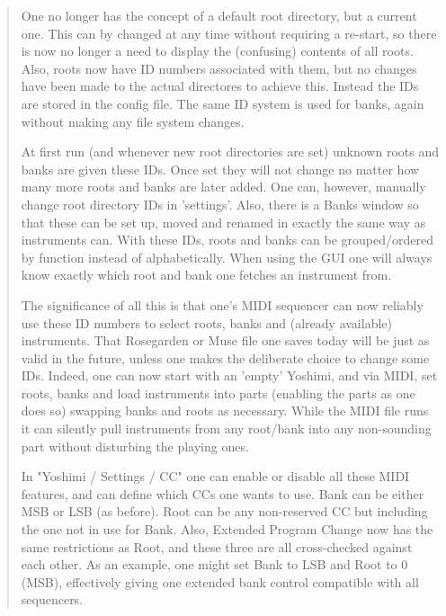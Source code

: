    \begin{quotation}
      One no longer has the concept of a default root directory, but a
      current one. This can by changed at any time without requiring a
      re-start, so there is now no longer a need to display the (confusing)
      contents of all roots.  Also, roots now have ID numbers associated
      with them, but no changes have been made to the actual directores to
      achieve this. Instead the IDs are stored in the config file. The same
      ID system is used for banks, again without making any file system
      changes.

      At first run (and whenever new root directories are set) unknown roots
      and banks are given these IDs. Once set they will not change no matter
      how many more roots and banks are later added. One can, however,
      manually change root directory IDs in 'settings'. Also, there is a
      Banks window so that these can be set up, moved and renamed in exactly
      the same way as instruments can.  With these IDs, roots and banks can
      be grouped/ordered by function instead of alphabetically. When using
      the GUI one will always know exactly which root and bank one fetches
      an instrument from.

      The significance of all this is that one's MIDI sequencer can now
      reliably use these ID numbers to select roots, banks and (already
      available) instruments. That Rosegarden or Muse file one saves
      today will be just as valid in the future, unless one makes the
      deliberate choice to change some IDs. Indeed, one can now start with
      an 'empty' Yoshimi, and via MIDI, set roots, banks and load
      instruments into parts (enabling the parts as one does so) swapping
      banks and roots as necessary. While the MIDI file runs it can silently
      pull instruments from any root/bank into any non-sounding part without
      disturbing the playing ones.

      In "Yoshimi / Settings / CC" one can enable or disable all these MIDI
      features, and can define which CCs one wants to use. Bank can be either
      MSB or LSB (as before). Root can be any non-reserved CC but including
      the one not in use for Bank. Also, Extended Program Change now has the
      same restrictions as Root, and these three are all cross-checked
      against each other. As an example, one might set Bank to LSB and Root
      to 0 (MSB), effectively giving one extended bank control compatible
      with all sequencers.


\end{quotation}
